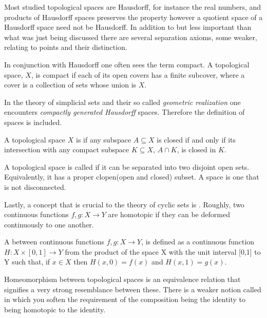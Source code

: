 \documentclass[../../main.tex]{subfiles}
\begin{document}
    Most studied topological spaces are Hausdorff, for instance the real numbers, and products of Hausdorff spaces preserves the property however a quotient space of a Hausdorff space need not be Hausdorff. In addition to but less important than what was just being discussed there are several separation axioms, some weaker, relating to points and their distinction. 
    
    In conjunction with Hausdorff one often sees the term compact. A topological space, $X$, is compact if each of its open covers has a finite subcover, where a cover is a collection of sets whose union is $X$.

    In the theory of simplicial sets and their so called \textit{geometric realization} one encounters \textit{compactly generated Hausdorff} spaces. Therefore the definition of  spaces is included.

    \begin{definition}
        A topological space $X$ is  if any subspace $A \subseteq X$ is closed if and only if its intersection with any compact subspace $K \subseteq X$, $A \cap K$, is closed in $K$.
    \end{definition}

    A topological space is called  if it can be separated into two disjoint open sets. Equivalently, it has a proper clopen(open and closed) subset. A  space is one that is not disconnected.

    Lastly, a concept that is crucial to the theory of cyclic sets is . Roughly, two continuous functions $f, g: X \to Y$ are homotopic if they can be deformed continuously to one another.

    \begin{definition}
        A  between continuous functions $f,g: X\to Y$, is defined as a continuous function  $H : X \times [0,1] \to Y$ from the product of the space X with the unit interval [0,1] to Y such that, if $x \in X$ then $H(x,0) = f(x)$ and $H(x,1) = g(x)$.
    \end{definition}

    Homeomorphism between topological spaces is an equivalence relation that signifies a very strong resemblance between these. There is a weaker notion called  in which you soften the requirement of the composition being the identity to being homotopic to the identity.
\end{document}
